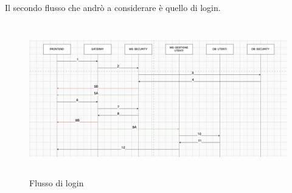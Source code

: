 Il secondo flusso che andrò a considerare è quello di login.

\begin{center}
    \begin{figure}[h]
        \includegraphics[width=450px, height=250px]{./images/flusso_login.png}
        \caption{Flusso di login}
        \label{fig:Registration}
    \end{figure}
\end{center}

